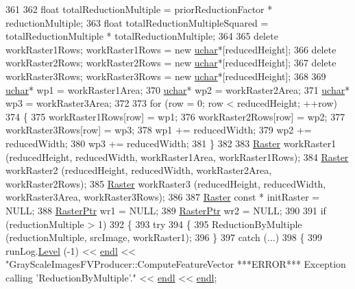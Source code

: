 \begin{DoxyCode}
361 
362   \textcolor{keywordtype}{float}    totalReductionMultiple = priorReductionFactor * reductionMultiple;
363   \textcolor{keywordtype}{float}    totalReductionMultipleSquared = totalReductionMultiple * totalReductionMultiple;
364 
365   \textcolor{keyword}{delete}  workRaster1Rows;  workRaster1Rows = \textcolor{keyword}{new} \hyperlink{namespace_k_k_b_ace9969169bf514f9ee6185186949cdf7}{uchar}*[reducedHeight];
366   \textcolor{keyword}{delete}  workRaster2Rows;  workRaster2Rows = \textcolor{keyword}{new} \hyperlink{namespace_k_k_b_ace9969169bf514f9ee6185186949cdf7}{uchar}*[reducedHeight];
367   \textcolor{keyword}{delete}  workRaster3Rows;  workRaster3Rows = \textcolor{keyword}{new} \hyperlink{namespace_k_k_b_ace9969169bf514f9ee6185186949cdf7}{uchar}*[reducedHeight];
368 
369   \hyperlink{namespace_k_k_b_ace9969169bf514f9ee6185186949cdf7}{uchar}*  wp1 = workRaster1Area;
370   \hyperlink{namespace_k_k_b_ace9969169bf514f9ee6185186949cdf7}{uchar}*  wp2 = workRaster2Area;
371   \hyperlink{namespace_k_k_b_ace9969169bf514f9ee6185186949cdf7}{uchar}*  wp3 = workRaster3Area;
372 
373   \textcolor{keywordflow}{for}  (row = 0;  row < reducedHeight; ++row)
374   \{
375     workRaster1Rows[row] = wp1;
376     workRaster2Rows[row] = wp2;
377     workRaster3Rows[row] = wp3;
378     wp1 += reducedWidth;
379     wp2 += reducedWidth;
380     wp3 += reducedWidth;
381   \}
382 
383   \hyperlink{class_k_k_b_1_1_raster}{Raster}  workRaster1 (reducedHeight, reducedWidth, workRaster1Area, workRaster1Rows);
384   \hyperlink{class_k_k_b_1_1_raster}{Raster}  workRaster2 (reducedHeight, reducedWidth, workRaster2Area, workRaster2Rows);
385   \hyperlink{class_k_k_b_1_1_raster}{Raster}  workRaster3 (reducedHeight, reducedWidth, workRaster3Area, workRaster3Rows);
386 
387   \hyperlink{class_k_k_b_1_1_raster}{Raster} \textcolor{keyword}{const} * initRaster = NULL;
388   \hyperlink{class_k_k_b_1_1_raster}{RasterPtr}      wr1        = NULL;
389   \hyperlink{class_k_k_b_1_1_raster}{RasterPtr}      wr2        = NULL;
390 
391   \textcolor{keywordflow}{if}  (reductionMultiple > 1)
392   \{
393     \textcolor{keywordflow}{try}
394     \{
395       ReductionByMultiple (reductionMultiple, srcImage, workRaster1);
396     \}
397     \textcolor{keywordflow}{catch}  (...)
398     \{
399       runLog.\hyperlink{class_k_k_b_1_1_run_log_a32cf761d7f2e747465fd80533fdbb659}{Level} (-1) << \hyperlink{namespace_k_k_b_ad1f50f65af6adc8fa9e6f62d007818a8}{endl} << \textcolor{stringliteral}{"GrayScaleImagesFVProducer::ComputeFeatureVector   ***ERROR*** 
       Exception calling 'ReductionByMultiple'."}  << \hyperlink{namespace_k_k_b_ad1f50f65af6adc8fa9e6f62d007818a8}{endl} << \hyperlink{namespace_k_k_b_ad1f50f65af6adc8fa9e6f62d007818a8}{endl};

\end{DoxyCode}

